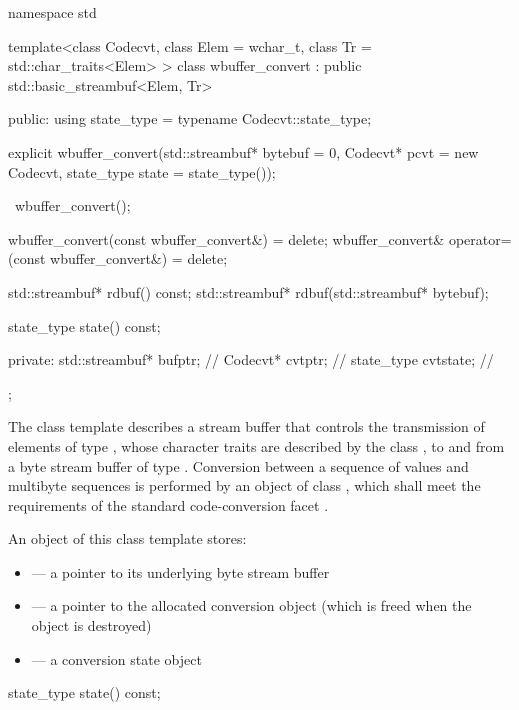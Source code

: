 %
\begin{codeblock}
namespace std {
template<class Codecvt,
    class Elem = wchar_t,
    class Tr = std::char_traits<Elem> >
  class wbuffer_convert
    : public std::basic_streambuf<Elem, Tr> {
  public:
    using state_type = typename Codecvt::state_type;

    explicit wbuffer_convert(std::streambuf* bytebuf = 0,
                             Codecvt* pcvt = new Codecvt,
                             state_type state = state_type());

    ~wbuffer_convert();

    wbuffer_convert(const wbuffer_convert&) = delete;
    wbuffer_convert& operator=(const wbuffer_convert&) = delete;

    std::streambuf* rdbuf() const;
    std::streambuf* rdbuf(std::streambuf* bytebuf);

    state_type state() const;

  private:
    std::streambuf* bufptr;         // \expos
    Codecvt* cvtptr;                // \expos
    state_type cvtstate;            // \expos
  };
}
\end{codeblock}

\pnum
The class template describes a stream buffer that controls the
transmission of elements of type , whose character traits are
described by the class , to and from a byte stream buffer of type
. Conversion between a sequence of  values and
multibyte sequences is performed by an object of class
, which shall meet the requirements
of the standard code-conversion facet .

\pnum
An object of this class template stores:

\begin{itemize}
\item {} --- a pointer to its underlying byte stream buffer
\item {} --- a pointer to the allocated conversion object
(which is freed when the  object is destroyed)
\item {} --- a conversion state object
\end{itemize}

%
%
\begin{itemdecl}
state_type state() const;
\end{itemdecl}

